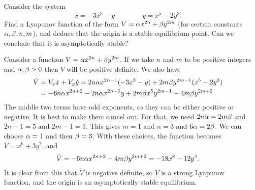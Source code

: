 \documentclass[a4paper]{amsart}
\begin{document}
\begin{exercise}\label{ex-lyapunov-b}
 Consider the system 
 \[ \dot{x} = -3x^3 - y \hspace{4em} \dot{y} = x^5 - 2y^3. \]
 Find a Lyapunov function of the form $V=\alpha x^{2n}+\beta y^{2m}$ (for
 certain constants $\alpha,\beta,n,m$), and deduce that the origin is a
 stable equilibrium point.  Can we conclude that it is asymptotically
 stable? 
\end{exercise}
\begin{solution}
 Consider a function $V=\alpha x^{2n}+\beta y^{2m}$.  If we take $n$ and
 $m$ to be positive integers and $\alpha,\beta>0$ then $V$ will be positive
 definite.  We also have
 \begin{align*}
  \dot{V} &= V_x\dot{x} + V_y\dot{y} 
           = 2n\alpha x^{2n-1}(-3x^3-y) + 2m\beta y^{2m-1}(x^5-2y^3) \\
          &= -6n\alpha x^{2n+2} 
             -2n\alpha x^{2n-1}y 
             +2m\beta x^5y^{2m-1}
             -4m\beta y^{2m+2}.
 \end{align*}
 The middle two terms have odd exponents, so they can be either
 positive or negative.  It is best to make them cancel out.  For that,
 we need $2n\alpha=2m\beta$ and $2n-1=5$ and $2m-1=1$.  This gives $m=1$
 and $n=3$ and $6\alpha=2\beta$.  We can choose $\alpha=1$ and then $\beta=3$.
 With these choices, the function becomes $V=x^6+3y^2$, and
 \[ \dot{V} = -6n\alpha x^{2n+2} - 4m\beta y^{2m+2} = -18x^8-12y^4. \]
 It is clear from this that $\dot{V}$ is negative definite, so $V$ is
 a strong Lyapunov function, and the origin is an asymptotically
 stable equilibrium.
\end{solution}
\end{document}
